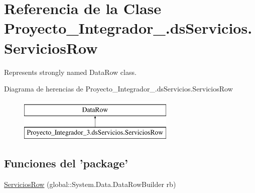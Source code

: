 \hypertarget{class_proyecto___integrador__3_1_1ds_servicios_1_1_servicios_row}{\section{Referencia de la Clase Proyecto\-\_\-\-Integrador\-\_.\-ds\-Servicios.\-Servicios\-Row}
\label{class_proyecto___integrador__3_1_1ds_servicios_1_1_servicios_row}
}


Represents strongly named Data\-Row class.  


Diagrama de herencias de Proyecto\-\_\-\-Integrador\-\_.\-ds\-Servicios.\-Servicios\-Row\begin{figure}[H]
\begin{center}
\leavevmode
\includegraphics[height=2.000000cm]{d8/d29/class_proyecto___integrador__3_1_1ds_servicios_1_1_servicios_row}
\end{center}
\end{figure}
\subsection*{Funciones del 'package'}
\begin{DoxyCompactItemize}
\item 
\hyperlink{class_proyecto___integrador__3_1_1ds_servicios_1_1_servicios_row_a3e8c82b3f9d5089c8437d38a4980bb5d}{Servicios\-Row} (global\-::\-System.\-Data.\-Data\-Row\-Builder rb)
\end{DoxyCompactItemize}
